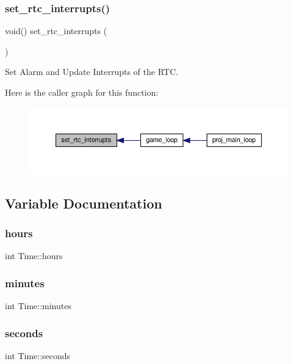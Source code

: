 \subsubsection{\texorpdfstring{set\+\_\+rtc\+\_\+interrupts()}{set\_rtc\_interrupts()}}
{\footnotesize\ttfamily void() set\+\_\+rtc\+\_\+interrupts (\begin{DoxyParamCaption}{ }\end{DoxyParamCaption})}



Set Alarm and Update Interrupts of the R\+TC. 

Here is the caller graph for this function\+:
\nopagebreak
\begin{figure}[H]
\begin{center}
\leavevmode
\includegraphics[width=350pt]{group__rtc_ga298c9a14801d124c4b3a61a7dd0dc5f6_icgraph}
\end{center}
\end{figure}


\subsection{Variable Documentation}
\mbox{\label{group__rtc_gaa207ff7d820b4c32f22e1474a931b195}} 
\subsubsection{\texorpdfstring{hours}{hours}}
{\footnotesize\ttfamily int Time\+::hours}

\mbox{\label{group__rtc_gacdca8b13b904057dfec90b68f3092bc4}} 
\subsubsection{\texorpdfstring{minutes}{minutes}}
{\footnotesize\ttfamily int Time\+::minutes}

\mbox{\label{group__rtc_ga4eda0725cd2272762ceae3336ca07db6}} 
\subsubsection{\texorpdfstring{seconds}{seconds}}
{\footnotesize\ttfamily int Time\+::seconds}

